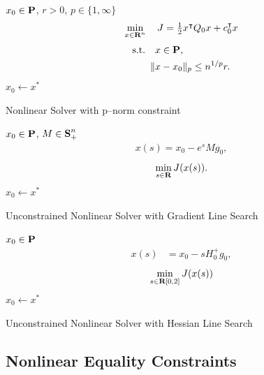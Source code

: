 \documentclass{article}
\begin{document}
    \begin{algorithm}[H]
        \SetAlgoLined
        $x_0 \in\textbf{P}$, $r>0$, $p\in\{1,\infty\}$\\
        {
            \begin{align*}
                \min_{x\in\textbf{R}^n}\quad J = \textstyle\frac{1}{2}x^\intercal Q_0 x+c_0^\intercal x
            \end{align*}
            \begin{align*}
                \text{s.t.} \quad &x\in\textbf{P},\\
                \|&x-x_0\|_p\leq n^{1/p}r.
            \end{align*}
            $x_0\leftarrow x^*$
        }
    \caption{Nonlinear Solver with p--norm constraint}
    \label{algo:it25}
    \end{algorithm} 
    \begin{algorithm}[H]
        \SetAlgoLined
        $x_0\in\textbf{P}$, $M\in\textbf{S}_+^n$\\
        {
            \begin{align*}
                x(s)=x_0-e^sMg_0,
            \end{align*}
            \begin{align*}
                \min_{s\in\textbf{R}} J(x(s)).
            \end{align*}
            $x_0\leftarrow x^*$
        }
    \caption{Unconstrained Nonlinear Solver with Gradient Line Search}
    \label{algo:it24}
    \end{algorithm}
    \begin{algorithm}[H]
        \SetAlgoLined
        $x_0\in\textbf{P}$\\
        {
            \begin{align*}
                x(s)&=x_0-sH_0^+g_0,
            \end{align*}
            \begin{align*}
                \min_{s\in\textbf{R}[0,2]} J(x(s))
            \end{align*}
            $x_0\leftarrow x^*$
        }
    \caption{Unconstrained Nonlinear Solver with Hessian Line Search}
    \label{algo:it23}
    \end{algorithm}

\clearpage
\subsection{Nonlinear Equality Constraints}\label{sec:np_constraint}
\end{document}

